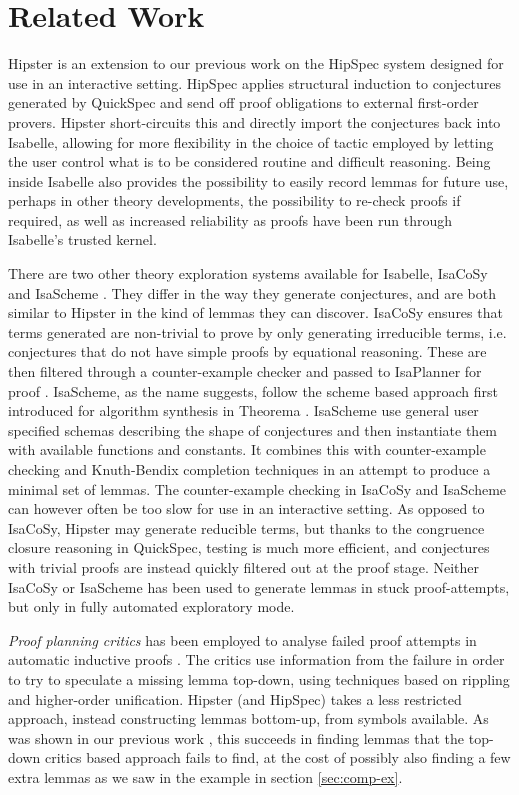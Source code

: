 \section{Related Work}
\label{sec:related}


Hipster is an extension to our previous work on the HipSpec system \cite{hipspecCADE} designed for use in an interactive setting. HipSpec applies structural induction to conjectures generated by QuickSpec and send off proof obligations to external first-order provers. Hipster short-circuits this and directly import the conjectures back into Isabelle, allowing for more flexibility in the choice of tactic employed by letting the user control what is to be considered routine and difficult reasoning. Being inside Isabelle also provides the possibility to easily record lemmas for future use, perhaps in other theory developments,  the possibility to re-check proofs if required, as well as increased reliability as proofs have been run through Isabelle's trusted kernel. 

There are two other theory exploration systems available for Isabelle, IsaCoSy \cite{isacosy} and IsaScheme \cite{isascheme}. They differ in the way they generate conjectures, and are both similar to Hipster in the kind of lemmas they can discover. 
IsaCoSy ensures that terms generated are non-trivial to prove by only generating irreducible terms, i.e. conjectures that do not have simple proofs by equational reasoning. These are then filtered through a counter-example checker and passed to IsaPlanner for proof \cite{isaplanner}. IsaScheme, as the name suggests, follow the scheme based approach first introduced for algorithm synthesis in Theorema \cite{theorema}. IsaScheme use general user specified schemas describing the shape of conjectures and then instantiate them with available functions and constants. It combines this with counter-example checking and Knuth-Bendix completion techniques in an attempt to produce a minimal set of lemmas. 
The counter-example checking in IsaCoSy and IsaScheme can however often be too slow for use in an interactive setting. As opposed to IsaCoSy, Hipster may generate reducible terms, but thanks to the congruence closure reasoning in QuickSpec, testing is much more efficient, and conjectures with trivial proofs are instead quickly filtered out at the proof stage. 
Neither IsaCoSy or IsaScheme has been used to generate lemmas in stuck proof-attempts, but only in fully automated exploratory mode. 

\emph{Proof planning critics} has been employed to analyse failed proof attempts in automatic inductive proofs \cite{productiveuse}. The critics use information from the failure in order to try to speculate a missing lemma top-down, using techniques based on rippling and higher-order unification. Hipster (and HipSpec) takes a less restricted approach, instead constructing lemmas bottom-up, from symbols available. As was shown in our previous work \cite{hipspecCADE}, this succeeds in finding lemmas that the top-down critics based approach fails to find, at the cost of possibly also finding a few extra lemmas as we saw in the example in section \ref{sec:comp-ex}.   

